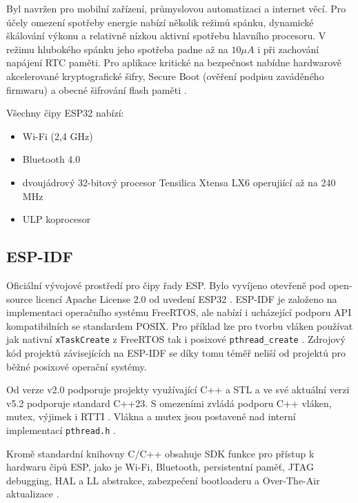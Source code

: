 Byl navržen pro mobilní zařízení, průmyslovou automatizaci a internet věcí. Pro účely omezení spotřeby energie nabízí několik režimů spánku, dynamické škálování výkonu a relativně nízkou aktivní spotřebu hlavního procesoru. V režimu hlubokého spánku jeho spotřeba padne až na $10 \mu A$ i při zachování napájení RTC paměti. Pro aplikace kritické na bezpečnost nabídne hardwarově akcelerované kryptografické šifry, Secure Boot (ověření podpisu zaváděného firmwaru) a obecné šifrování flash paměti \cite{esp32_datasheet}. 

Všechny čipy ESP32 nabízí\cite{espressifProductOverviewESP32}:
\begin{itemize}
    \item Wi-Fi (2,4 GHz)
    \item Bluetooth 4.0
    \item dvoujádrový 32-bitový procesor Tensilica Xtensa LX6 operujiící až na 240 MHz
    \item ULP koprocesor\cite{ULPCoprocessorProgramming}
\end{itemize}

\subsection{ESP-IDF}
Oficiální vývojové prostředí pro čipy řady ESP. Bylo vyvíjeno otevřeně pod open-source licencí Apache License 2.0 od uvedení ESP32 \cite{grokhotkovInitialPublicVersion2016}. ESP-IDF je založeno na implementaci operačního systému FreeRTOS, ale nabízí i ucházející podporu API kompatibilních se standardem POSIX. Pro příklad lze pro tvorbu vláken používat jak nativní \lstinline|xTaskCreate| z FreeRTOS tak i posixové \lstinline|pthread_create| \cite{espressifPOSIXThreadsSupport}. Zdrojový kód projektů závisejících na ESP-IDF se díky tomu téměř neliší od projektů pro běžné posixové operační systémy.

Od verze v2.0 podporuje projekty využívající C++ a STL \cite{grokhotkovReleaseESPIDFRelease} a ve své aktuální verzi v5.2 podporuje standard C++23. S omezeními zvládá podporu C++ vláken, mutex, výjimek i RTTI \cite{espressifSupportESP32ESPIDF}. Vlákna a mutex jsou postavené nad interní implementací \lstinline|pthread.h| \cite{espressifPOSIXThreadsSupport}.

Kromě standardní knihovny C/C++ obsahuje SDK funkce pro přístup k hardwaru čipů ESP, jako je Wi-Fi, Bluetooth, persistentní paměť, JTAG debugging, HAL a LL abstrakce, zabezpečení bootloaderu a Over-The-Air aktualizace \cite{espressifAPIGuidesESP32}.

